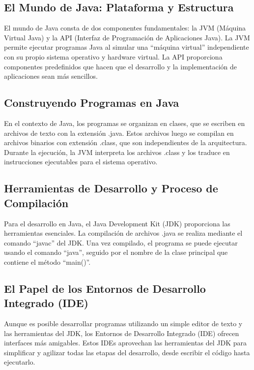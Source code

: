 \documentclass[11pt, twocolumn]{article}
\begin{document}
    \subsection*{El Mundo de Java: Plataforma y Estructura}
    El mundo de Java consta de dos componentes fundamentales: la JVM (Máquina Virtual Java) y la API (Interfaz de Programación de Aplicaciones Java). La JVM permite ejecutar programas Java al simular una ``máquina virtual'' independiente con su propio sistema operativo y hardware virtual. La API proporciona componentes predefinidos que hacen que el desarrollo y la implementación de aplicaciones sean más sencillos.
    
    \subsection*{Construyendo Programas en Java}
    En el contexto de Java, los programas se organizan en clases, que se escriben en archivos de texto con la extensión .java. Estos archivos luego se compilan en archivos binarios con extensión .class, que son independientes de la arquitectura. Durante la ejecución, la JVM interpreta los archivos .class y los traduce en instrucciones ejecutables para el sistema operativo.
    
    \fancyfoot{}

    \subsection*{Herramientas de Desarrollo y Proceso de Compilación}
    Para el desarrollo en Java, el Java Development Kit (JDK) proporciona las herramientas esenciales. La compilación de archivos .java se realiza mediante el comando ``javac'' del JDK. Una vez compilado, el programa se puede ejecutar usando el comando ``java'', seguido por el nombre de la clase principal que contiene el método ``main()''.

    \subsection*{El Papel de los Entornos de Desarrollo Integrado (IDE)}
    Aunque es posible desarrollar programas utilizando un simple editor de texto y las herramientas del JDK, los Entornos de Desarrollo Integrado (IDE) ofrecen interfaces más amigables. Estos IDEs aprovechan las herramientas del JDK para simplificar y agilizar todas las etapas del desarrollo, desde escribir el código hasta ejecutarlo.
    
\end{document}
